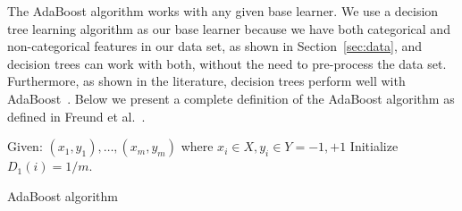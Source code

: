 The AdaBoost algorithm works with any given base learner. We use a decision
tree learning algorithm as our base learner because we have both categorical
and non-categorical features in our data set, as shown in
Section~\ref{sec:data}, and decision trees can work with both, without the need
to pre-process the data set. Furthermore, as shown in the literature, decision
trees perform well with AdaBoost~\cite{drucker1996boosting}. Below we present a
complete definition of the AdaBoost algorithm as defined in Freund et
al.~\cite{freund1999short}.

\begin{algorithm}
\begin{algorithmic}
\STATE Given: $(x_1,y_1),\dots,(x_m,y_m)$ where $x_i \in X, y_i \in Y = {-1,+1}$
\STATE Initialize $D_1(i) = 1/m$.
  \ENDFOR
{}
\end{algorithmic}
\label{alg:adaboost}
\caption{AdaBoost algorithm \cite{freund1999short}}
\end{algorithm}

